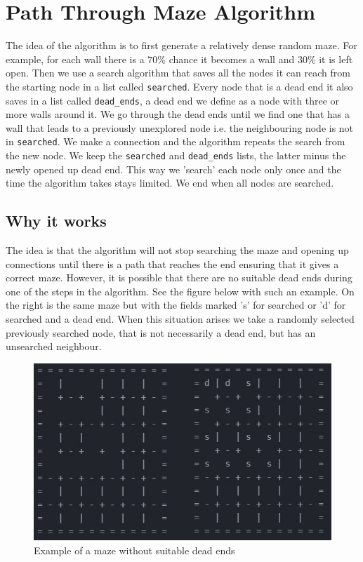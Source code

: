 \documentclass[10pt, a4paper, twoside]{amsart}
\newcommand{\1}{\mathbbm{1}}
\begin{document}
\section{Path Through Maze Algorithm}
The idea of the algorithm is to first generate a relatively dense random maze. For example, for each wall there is a $70\%$ chance it becomes a wall and $30\%$ it is left open. Then we use a search algorithm that saves all the nodes it can reach from the starting node in a list called \verb+searched+. Every node that is a dead end it also saves in a list called \verb+dead_ends+, a dead end we define as a node with three or more walls around it. We go through the dead ends until we find one that has a wall that leads to a previously unexplored node i.e. the neighbouring node is not in \verb+searched+. We make a connection and the algorithm repeats the search from the new node. We keep the \verb+searched+ and \verb+dead_ends+ lists, the latter minus the newly opened up dead end. This way we 'search' each node only once and the time the algorithm takes stays limited. We end when all nodes are searched.

\subsection{Why it works}
The idea is that the algorithm will not stop searching the maze and opening up connections until there is a path that reaches the end ensuring that it gives a correct maze. However, it is possible that there are no suitable dead ends during one of the steps in the algorithm. See the figure below with such an example. On the right is the same maze but with the fields marked 's' for searched or 'd' for searched and a dead end. When this situation arises we take a randomly selected previously searched node, that is not necessarily a dead end, but has an unsearched neighbour.

\begin{figure}
\centering
        \includegraphics[totalheight=8cm]{nodeadends}
    \caption{Example of a maze without suitable dead ends}
\end{figure}
\end{document}
